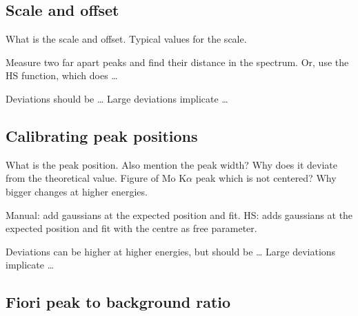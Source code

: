 \subsection{Scale and offset}
\label{theory:qc:scaleoffset}

What is the scale and offset.
Typical values for the scale.

Measure two far apart peaks and find their distance in the spectrum.
Or, use the HS function, which does \dots

Deviations should be \dots
Large deviations implicate \dots


\subsection{Calibrating peak positions}
\label{theory:qc:peakpositions}

What is the peak position.
Also mention the peak width?
Why does it deviate from the theoretical value.
Figure of Mo K$\alpha$ peak which is not centered?
Why bigger changes at higher energies.

Manual: add gaussians at the expected position and fit.
HS: adds gaussians at the expected position and fit with the centre as free parameter.

Deviations can be higher at higher energies, but should be \dots
Large deviations implicate \dots



\subsection{Fiori peak to background ratio}
\label{theory:qc:fiori}


